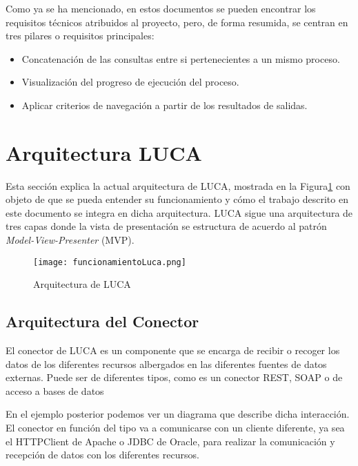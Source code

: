 Como ya se ha mencionado, en estos documentos se pueden encontrar los requisitos técnicos atribuidos al proyecto, pero, de forma resumida, se centran en tres pilares o requisitos principales:



\begin{itemize}
	\item Concatenación de las consultas entre si pertenecientes a un mismo proceso.
	\item Visualización del progreso de ejecución del proceso.
	\item Aplicar criterios de navegación a partir de los resultados de salidas.
\end{itemize}


\section{Arquitectura LUCA}


Esta sección explica la actual arquitectura de LUCA, mostrada en la Figura\ref{fig:funcionamientoLuca} con objeto de que se pueda entender su funcionamiento y cómo el trabajo descrito en este documento se integra en dicha arquitectura. LUCA sigue una arquitectura de tres capas donde la vista de presentación se estructura de acuerdo al patrón \emph{Model-View-Presenter} (MVP).


\begin{figure}[!tb]
	\centering
	\texttt{[image: funcionamientoLuca.png]}
	\caption{Arquitectura de LUCA}
    \label{fig:funcionamientoLuca}
\end{figure}



\subsection{Arquitectura del Conector}


El conector de LUCA es un componente que se encarga de recibir o recoger los datos de los diferentes recursos albergados en las diferentes fuentes de datos externas. Puede ser de diferentes tipos, como es un conector REST, SOAP o de acceso a bases de datos

En el ejemplo posterior podemos ver un diagrama que describe dicha interacción. El conector en función del tipo va a comunicarse con un cliente diferente, ya sea el HTTPClient \cite{httpclient} de Apache o JDBC \cite{jdbc} de Oracle, para realizar la comunicación y recepción de datos con los diferentes recursos.

